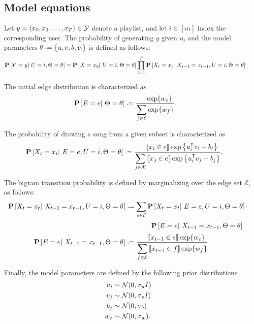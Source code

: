 \documentclass{article}
\def\E{\ensuremath{\mathcal{E}}}
\begin{document}
\subsection{Model equations}

Let $y = (x_0, x_1, \dots, x_T) \in \mathcal{Y}$ denote a playlist, and let $i \in [m]$ index the corresponding user.
The probability of generating $y$ given $u_i$ and the model parameters $\theta \defeq \{u, v, b, w\}$ is defined as follows:
\begin{align*}
\mathbf{P}\left[Y = y |~ U = i, \Theta = \theta \right] &= \mathbf{P}\left[X = x_0 |~ U = i, \Theta = \theta\right]
\prod_{t=1}^{T} \mathbf{P}\left[X_t = x_t |~ X_{t-1}=x_{t-1}, U=i, \Theta=\theta \right]
\end{align*}

The initial edge distribution is characterized as
\begin{align*}
\P\left[E = e \given \Theta = \theta\right] & \defeq \frac{\phantom\sum \exp\{w_e\}}{\displaystyle\sum_{f\in \E} \exp\{w_f\}}
\end{align*}

The probability of drawing a song from a given subset is characterized as
\begin{align*}
\P\left[X_t=x_t \given E=e, U=i, \Theta=\theta \right] &\defeq 
\frac{\phantom\sum\ind{x_t \in e}\exp\left\{u_i\trans v_t + b_t\right\}}{\displaystyle\sum_{j \in \X}\ind{x_j \in e} \exp\left\{u_i\trans v_j + b_j\right\}},
\end{align*}

The bigram transition probability is defined by marginalizing over the edge set $\E$, as follows:
\begin{align*}
\P\left[X_{t}= x_t \given X_{t-1}=x_{t-1}, U=i, \Theta=\theta \right] &\defeq \sum_{e \in \E} 
\P\left[X_{t}=x_t \given E=e, U=i, \Theta=\theta\right]\cdot\\
&\phantom{\defeq \sum}\quad\P\left[E=e \given X_{t-1} = x_{t-1}, \Theta=\theta\right]\\
\P\left[E=e \given X_{t-1}=x_{t-1}, \Theta=\theta\right] &\defeq \frac{\phantom\sum\ind{x_{t-1}\in e}\exp\{w_e\}}{ \displaystyle\sum_{f \in \E} \ind{x_{t-1} \in f} \exp\{w_f\} }
\end{align*}

Finally, the model parameters are defined by the following prior distributions
\begin{align*}
u_i &\sim \mathcal{N}(0, \sigma_u I)\\
v_j &\sim \mathcal{N}(0, \sigma_v I)\\
b_j &\sim \mathcal{N}(0, \sigma_b)\\
w_e &\sim \mathcal{N}(0, \sigma_w).\\
\end{align*}
\end{document}
